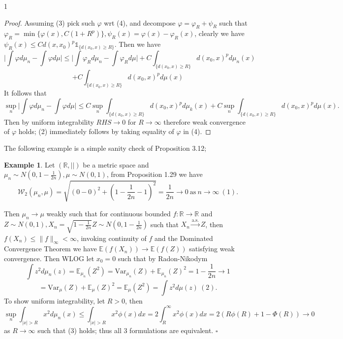 \documentclass[12pt]{article}
\theoremstyle{definition}
\newtheorem*{example}{Example}
\theoremstyle{plain}
\begin{document}
\begin{spacing}{1}
{\begin{proof}
    Assuming (3) pick such $\varphi$ wrt (4), and decompose $\varphi = \varphi_R + \psi_R$ such that $\varphi_R = \min\{\varphi(x), C(1 + R^p)\}, \psi_R(x) = \varphi(x)- \varphi_R(x)$, clearly we have $\psi_R(x) \leq Cd(x, x_0)^p \mathds{1}_{\{d(x_0, x) \geq R\}}$. Then we have
    \[
    \bigg \lvert \displaystyle \int \varphi d\mu_n - \int \varphi d\mu \bigg \lvert \leq \bigg \lvert \displaystyle \int \varphi_R d\mu_n - \int \varphi_R d\mu \bigg \rvert + C \int_{\{d(x_0, x) \geq R\}} d(x_0, x)^p d\mu_n(x)
    \]
    \[
    + C \int_{\{d(x_0, x) \geq R\}} d(x_0, x)^p d\mu(x)
    \]
    It follows that
    \[
    \sup_n \bigg \lvert \displaystyle \int \varphi d\mu_n - \int \varphi d\mu \bigg \rvert \leq C \sup_n \int_{\{d(x_0, x) \geq R\}} d(x_0, x)^p d\mu_k(x) + C \sup_n \int_{\{d(x_0, x) \geq R\}} d(x_0, x)^p d\mu(x).  
    \]
    Then by uniform integrability $RHS \rightarrow 0$ for $R \rightarrow \infty$ therefore weak convergence of $\varphi$ holds; (2) immediately follows by taking equality of $\varphi$ in (4). 
\end{proof}

The following example is a simple sanity check of Proposition 3.12;
\begin{example}
    Let $(\mathbb{R}, \lvert \rvert)$ be a metric space and $\mu_n \sim N(0, 1 - \frac{1}{2n}), \mu \sim N(0, 1)$, from Proposition 1.29 we have
    \[
    \mathcal{W}_2(\mu_n, \mu) = \sqrt{(0 - 0)^2 + (1 - \frac{1}{2n} - 1)^2} = \frac{1}{2n} \rightarrow 0 \ \text{as} \ n \rightarrow \infty \ (1).
    \]

\end{example}

Then $\mu_n \rightarrow \mu$ weakly such that for continuous bounded $f: \mathbb{R} \rightarrow \mathbb{R}$ and $Z \sim N(0, 1), X_n = \sqrt{1 - \frac{1}{2n}}Z \sim N(0, 1 - \frac{1}{2n})$ such that $X_n\xrightarrow{\text{a.s.}}Z$, then $f(X_n) \leq \lVert f \rVert_\infty < \infty$, invoking continuity of $f$ and the Dominated Convergence Theorem we have $\mathbb{E}(f(X_n)) \rightarrow \mathbb{E}(f(Z))$ satisfying weak convergence. Then WLOG let $x_0 = 0$ such that by Radon-Nikodym
\[
\displaystyle \int z^2 d\mu_n(z) =  \mathbb{E}_{\mu_n}(Z^2) = \text{Var}_{\mu_n} (Z) + \mathbb{E}_{\mu_n}(Z)^2 = 1- \frac{1}{2n} \rightarrow 1
\]
\[
= \text{Var}_{\mu}(Z) + \mathbb{E}_\mu(Z)^2 = \mathbb{E}_{\mu}(Z^2) = \int z^2 d\mu(z) \ (2). 
\]
To show uniform integrability, let $R > 0$, then
\[
\sup_n \displaystyle \int_{\lvert x \rvert > R} x^2 d\mu_n(x) \leq \int_{\lvert x \rvert > R} x^2 \phi(x) dx = 2 \int_R^\infty x^2\phi(x) dx = 2(R\phi(R) + 1 - \Phi(R)) \rightarrow 0
\]
as $R \rightarrow \infty$ such that (3) holds; thus all 3 formulations are equivalent. \hfill \(\square\) 

}
\end{spacing}
\end{document}
